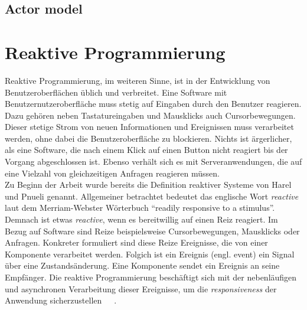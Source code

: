 \pagebreak

\subsection{Actor model}

\pagebreak

\section{Reaktive Programmierung}
Reaktive Programmierung, im weiteren Sinne, ist in der Entwicklung von Benutzeroberflächen üblich und verbreitet. Eine Software mit Benutzernutzeroberfläche muss stetig auf Eingaben durch den Benutzer reagieren. Dazu gehören neben Tastatureingaben und Mausklicks auch Cursorbewegungen. Dieser stetige Strom von neuen Informationen und Ereignissen muss verarbeitet werden, ohne dabei die Benutzeroberfläche zu blockieren. Nichts ist ärgerlicher, als eine Software, die nach einem Klick auf einen Button nicht reagiert bis der Vorgang abgeschlossen ist. Ebenso verhält sich es mit Serveranwendungen, die auf eine Vielzahl von gleichzeitigen Anfragen reagieren müssen.\\
Zu Beginn der Arbeit wurde bereits die Definition reaktiver Systeme von Harel und Pnueli genannt. Allgemeiner betrachtet bedeutet das englische Wort \textit{reactive} laut dem Merriam-Webster Wörterbuch \enquote{readily responsive to a stimulus}. Demnach ist etwas \textit{reactive}, wenn es bereitwillig auf einen Reiz reagiert. Im Bezug auf Software sind Reize beispielsweise Cursorbewegungen, Mausklicks oder Anfragen. Konkreter formuliert sind diese Reize Ereignisse, die von einer Komponente verarbeitet werden. Folgich ist ein Ereignis (engl. event) ein Signal über eine Zustandsänderung. Eine Komponente sendet ein Ereignis an seine Empfänger. Die reaktive Programmierung beschäftigt sich mit der nebenläufigen und asynchronen Verarbeitung dieser Ereignisse, um die \textit{responsiveness} der Anwendung sicherzustellen~\cite{rappl_introduction_2016}~\cite[S.~4]{carkci_dataflow_2014}~\cite[S.~5]{blackheath_functional_2015}.

